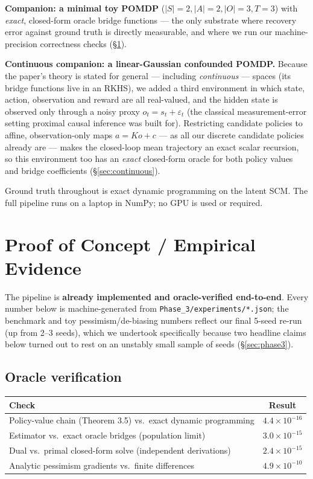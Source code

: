 \documentclass[11pt]{article}
\begin{document}
\textbf{Companion: a minimal toy POMDP} ($|S|{=}2, |A|{=}2, |O|{=}3, T{=}3$) with
\emph{exact}, closed-form oracle bridge functions --- the only substrate where recovery
error against ground truth is directly measurable, and where we run our machine-precision
correctness checks (\S\ref{sec:poc}).

\textbf{Continuous companion: a linear-Gaussian confounded POMDP.} Because the paper's
theory is stated for general --- including \emph{continuous} --- spaces (its bridge
functions live in an RKHS), we added a third environment in which state, action,
observation and reward are all real-valued, and the hidden state is observed only through
a noisy proxy $o_t = s_t + \varepsilon_t$ (the classical measurement-error setting proximal
causal inference was built for). Restricting candidate policies to affine, observation-only
maps $a = K o + c$ --- as all our discrete candidate policies already are --- makes the
closed-loop mean trajectory an exact scalar recursion, so this environment too has an
\emph{exact} closed-form oracle for both policy values and bridge coefficients
(\S\ref{sec:continuous}).

Ground truth throughout is exact dynamic programming on the latent SCM. The full pipeline
runs on a laptop in NumPy; no GPU is used or required.

\section{Proof of Concept / Empirical Evidence}
\label{sec:poc}

The pipeline is \textbf{already implemented and oracle-verified end-to-end}. Every number
below is machine-generated from \texttt{Phase\_3/experiments/*.json}; the benchmark and toy
pessimism/de-biasing numbers reflect our final 5-seed re-run (up from 2--3 seeds), which we
undertook specifically because two headline claims below turned out to rest on an
unstably small sample of seeds (\S\ref{sec:phase3}).

\subsection{Oracle verification}

\begin{center}
\begin{tabular}{@{}lc@{}}
\toprule
Check & Result \\
\midrule
Policy-value chain (Theorem 3.5) vs.\ exact dynamic programming & $4.4\times10^{-16}$ \\
Estimator vs.\ exact oracle bridges (population limit) & $3.0\times10^{-15}$ \\
Dual vs.\ primal closed-form solve (independent derivations) & $2.4\times10^{-15}$ \\
Analytic pessimism gradients vs.\ finite differences & $4.9\times10^{-10}$ \\
\bottomrule
\end{tabular}
\end{center}
\end{document}
